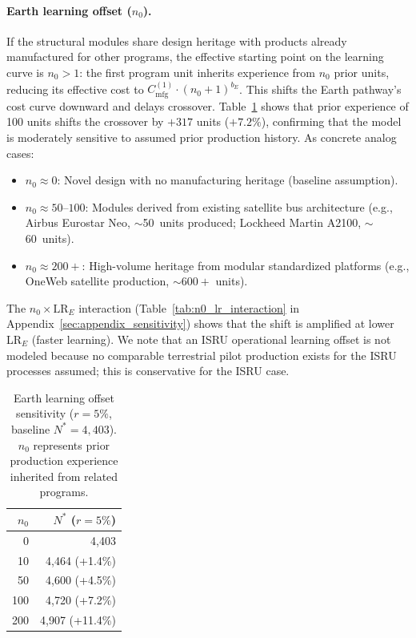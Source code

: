 \documentclass[preprint,12pt]{elsarticle}
\begin{document}
\paragraph{Earth learning offset ($n_0$).} If the structural modules share design heritage with products already manufactured for other programs, the effective starting point on the learning curve is $n_0 > 1$: the first program unit inherits experience from $n_0$ prior units, reducing its effective cost to $C_{\mathrm{mfg}}^{(1)} \cdot (n_0 + 1)^{b_E}$. This shifts the Earth pathway's cost curve downward and delays crossover. Table~\ref{tab:earth_n0} shows that prior experience of 100 units shifts the crossover by $+317$ units ($+7.2\%$), confirming that the model is moderately sensitive to assumed prior production history. As concrete analog cases:
\begin{itemize}
\item $n_0 \approx 0$: Novel design with no manufacturing heritage (baseline assumption).
\item $n_0 \approx 50$--$100$: Modules derived from existing satellite bus architecture (e.g., Airbus Eurostar Neo, $\sim$50~units produced; Lockheed Martin A2100, $\sim$60~units).
\item $n_0 \approx 200{+}$: High-volume heritage from modular standardized platforms (e.g., OneWeb satellite production, ${\sim}600{+}$ units).
\end{itemize}
The $n_0 \times \mathrm{LR}_E$ interaction (Table~\ref{tab:n0_lr_interaction} in Appendix~\ref{sec:appendix_sensitivity}) shows that the shift is amplified at lower LR$_E$ (faster learning). We note that an ISRU operational learning offset is not modeled because no comparable terrestrial pilot production exists for the ISRU processes assumed; this is conservative for the ISRU case.

\begin{table}[htbp]
\centering
\caption{Earth learning offset sensitivity ($r = 5\%$, baseline $N^* = 4{,}403$). $n_0$ represents prior production experience inherited from related programs.}
\label{tab:earth_n0}
\small
\begin{tabular}{@{}rr@{}}
\toprule
$n_0$ & $N^*$ ($r = 5\%$) \\
\midrule
0   & 4{,}403 \\
10  & 4{,}464 (+1.4\%) \\
50  & 4{,}600 (+4.5\%) \\
100 & 4{,}720 (+7.2\%) \\
200 & 4{,}907 (+11.4\%) \\
\bottomrule
\end{tabular}
\end{table}
\end{document}
